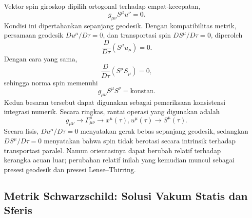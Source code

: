 Vektor spin giroskop dipilih ortogonal terhadap empat-kecepatan,
\begin{equation}
    g_{\mu\nu}S^\mu u^\nu=0.
    \label{eq:spin-constraint}
\end{equation}
Kondisi ini dipertahankan sepanjang geodesik. Dengan kompatibilitas metrik,
persamaan geodesik $Du^\mu/D\tau=0$, dan transportasi spin
$DS^\mu/D\tau=0$, diperoleh
\begin{equation}
    \frac{D}{D\tau}\left(S^\mu u_\mu\right)=0.
\end{equation}
Dengan cara yang sama,
\begin{equation}
    \frac{D}{D\tau}\left(S^\mu S_\mu\right)=0,
\end{equation}
sehingga norma spin memenuhi
\begin{equation}
    g_{\mu\nu}S^\mu S^\nu=\text{konstan}.
    \label{eq:spin-norm}
\end{equation}
Kedua besaran tersebut dapat digunakan sebagai pemeriksaan konsistensi
integrasi numerik. Secara ringkas, rantai operasi yang digunakan adalah
\begin{equation}
    g_{\mu\nu}
    \longrightarrow
    \Gamma^\rho_{\mu\nu}
    \longrightarrow
    x^\mu(\tau),u^\mu(\tau)
    \longrightarrow
    S^\mu(\tau).
    \label{eq:orbit-spin-chain}
\end{equation}
Secara fisis, $Du^\mu/D\tau=0$ menyatakan gerak bebas sepanjang geodesik,
sedangkan $DS^\mu/D\tau=0$ menyatakan bahwa spin tidak berotasi secara
intrinsik terhadap transportasi paralel. Namun orientasinya dapat berubah
relatif terhadap kerangka acuan luar; perubahan relatif inilah yang
kemudian muncul sebagai presesi geodesik dan presesi Lense--Thirring.


\subsection{Metrik Schwarzschild: Solusi Vakum Statis dan Sferis}
\label{subsec:metrik-schwarzschild}

